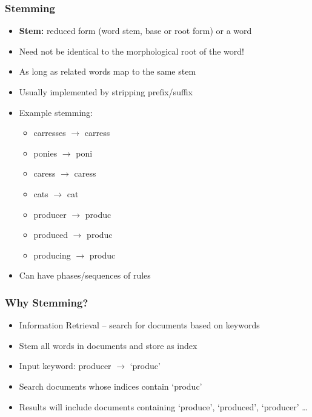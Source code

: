 \begin{frame}[allowframebreaks]
\frametitle{Stemming}
    
\begin{itemize}
\item \textbf{Stem:} reduced form (word stem, base or root form) or a word
\item Need not be identical to the morphological root of the word!
\item As long as related words map to the same stem
\item Usually implemented by stripping prefix/suffix

\framebreak

\item Example stemming:
	\begin{itemize}
	\item carresses $\rightarrow$ carress
	\item ponies $\rightarrow$ poni
	\item caress $\rightarrow$ caress
	\item cats $\rightarrow$ cat
	\item producer $\rightarrow$ produc
	\item produced $\rightarrow$ produc
	\item producing $\rightarrow$ produc
	\end{itemize}

\item Can have phases/sequences of rules \parencite{porter:1980,paice:1994}
\end{itemize}

\end{frame}

\begin{frame}
\frametitle{Why Stemming?}
    
\begin{itemize}[<+->]
\item Information Retrieval -- search for documents based on keywords
\item Stem all words in documents and store as index
\item Input keyword: producer $\rightarrow$ `produc'
\item Search documents whose indices contain `produc'
\item Results will include documents containing `produce', `produced', `producer' \ldots
\end{itemize}

\end{frame}


